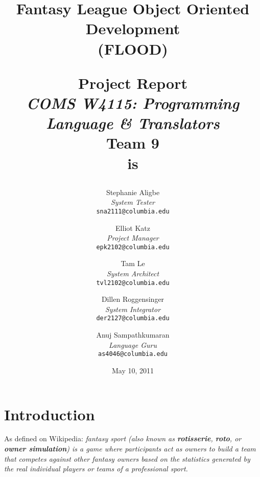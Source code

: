 \documentclass[12pt]{report}
\begin{document}
\title{
\textbf{Fantasy League Object Oriented Development}\\
\textbf{(FLOOD)}\\
\begin{doublespace}
\end{doublespace}
\LARGE{Project Report}\\
{\normalsize \textit{COMS W4115: Programming Language \& Translators}}\\
{\normalsize \textbf{Team 9}}\\
\normalsize{\textbf{is}}
}

\begin{singlespace}
\author{
  Stephanie Aligbe\\
  \textit{\normalsize{System Tester}}\\
  \texttt{\small{sna2111@columbia.edu}}
  \and
  Elliot Katz\\
  \textit{\normalsize{Project Manager}}\\
  \texttt{\small{epk2102@columbia.edu}}
  \and
  Tam Le\\
  \textit{\normalsize{System Architect}}\\
  \texttt{\small{tvl2102@columbia.edu}}
  \and
  Dillen Roggensinger\\
  \textit{\normalsize{System Integrator}}\\
  \texttt{\small{der2127@columbia.edu}}
  \and
  Anuj Sampathkumaran\\
  \textit{\normalsize{Language Guru}}\\
  \texttt{\small{as4046@columbia.edu}}
}
\end{singlespace}

\date{May 10, 2011}

\maketitle

\doublespacing

\tableofcontents

\chapter{Introduction}

As defined on Wikipedia: \textit{fantasy sport (also known as \textbf{rotisserie}, \textbf{roto}, or \textbf{owner simulation}) is a game where participants act as owners to build a team that competes against other fantasy owners based on the statistics generated by the real individual players or teams of a professional sport.}
\end{document}
